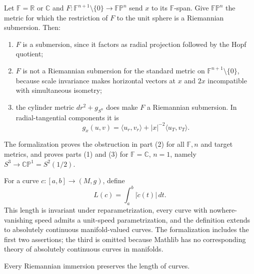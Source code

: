 \begin{remark}
  \label{rem:pet-ch1-ex-15}
  \leanok
  Let $\mathbb{F}=\mathbb{R}$ or $\mathbb{C}$ and
  $F:\mathbb{F}^{n+1}\setminus\{0\}\to\mathbb{FP}^n$ send $x$ to its
  $\mathbb{F}$-span. Give $\mathbb{FP}^n$ the metric for which the restriction
  of $F$ to the unit sphere is a Riemannian submersion. Then:
  \begin{enumerate}
    \item $F$ is a submersion, since it factors as radial projection followed
      by the Hopf quotient;
    \item $F$ is not a Riemannian submersion for the standard metric on
      $\mathbb{F}^{n+1}\setminus\{0\}$, because scale invariance makes
      horizontal vectors at $x$ and $2x$ incompatible with simultaneous
      isometry;
    \item the cylinder metric
      $dr^2+g_{S^n}$ does make $F$ a Riemannian submersion. In radial-tangential
      components it is
      \[
        g_x(u,v)=\langle u_r,v_r\rangle
          +|x|^{-2}\langle u_T,v_T\rangle.
      \]
  \end{enumerate}
  The formalization proves the obstruction in part (2) for all
  $\mathbb{F},n$ and target metrics, and proves parts (1) and (3) for
  $\mathbb{F}=\mathbb{C}$, $n=1$, namely
  $S^3\to\mathbb{CP}^1=S^2(1/2)$.
\end{remark}

\begin{remark}
  \label{rem:pet-ch1-ex-16}
  \leanok
  For a curve $c:[a,b]\to(M,g)$, define
  \[
    L(c)=\int_a^b|\dot c(t)|\,dt.
  \]
  This length is invariant under reparametrization, every curve with
  nowhere-vanishing speed admits a unit-speed parametrization, and the
  definition extends to absolutely continuous manifold-valued curves.
  The formalization includes the first two assertions; the third is omitted
  because Mathlib has no corresponding theory of absolutely continuous curves
  in manifolds.
\end{remark}

\begin{remark}
  \label{rem:pet-ch1-ex-17}
  \leanok
  Every Riemannian immersion preserves the length of curves.
\end{remark}

